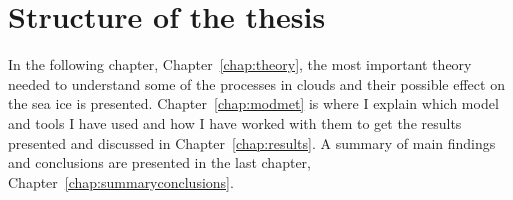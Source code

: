 

\section{Structure of the thesis}
In the following chapter, Chapter~\ref{chap:theory}, the most important theory needed to understand some of the processes in clouds and their possible effect on the sea ice is presented. Chapter~\ref{chap:modmet} is where I explain which model and tools I have used and how I have worked with them to get the results presented and discussed in Chapter~\ref{chap:results}. A summary of main findings and conclusions are presented in the last chapter, Chapter~\ref{chap:summaryconclusions}.